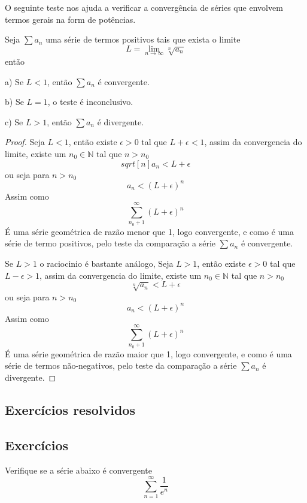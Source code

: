 O seguinte teste nos ajuda a verificar a convergência de séries que envolvem
termos gerais na form de potências.

\begin{teo}
    Seja $\sum a_n$ uma série de termos positivos tais que exista o limite
    $$L = \lim_{n \to \infty} \sqrt[n]{a_n} $$
    então
    \item [a)] Se $L < 1$, então $\sum a_n$ é convergente.
    \item [b)] Se $L = 1$, o teste é inconclusivo.
    \item [c)] Se $L > 1$, então $\sum a_n$ é divergente.
\end{teo}

\begin{proof}
    Seja $L<1$, então existe $\epsilon > 0$ tal que $L + \epsilon < 1$, assim
    da convergencia do limite, existe um $n_0 \in \mathbb{N}$ tal que $n>n_0$
    $$ sqrt[n]{a_n} < L + \epsilon$$
    ou seja para $n>n_0$
    $$ a_n < (L + \epsilon)^{n}$$    
    Assim como 
    $$\sum_{n_0+1}^{\infty} (L + \epsilon)^{n} $$
    É uma série geométrica de razão menor que 1, logo convergente, e como
    é uma série de termo positivos, pelo teste da comparação a série $\sum a_n$
    é convergente.

    Se $L>1$ o raciocinio é bastante análogo, Seja $L>1$, então existe $\epsilon > 0$
    tal que $L - \epsilon > 1$, assim da convergencia do limite, existe um 
    $n_0 \in \mathbb{N}$ tal que $n>n_0$
    $$ \sqrt[n]{a_n} < L + \epsilon$$
    ou seja para $n>n_0$
    $$ a_n < (L + \epsilon)^{n}$$    
    Assim como 
    $$\sum_{n_0+1}^{\infty} (L + \epsilon)^{n} $$   
    É uma série geométrica de razão maior que 1, logo convergente, e como
    é uma série de termos não-negativos, pelo teste da comparação a série $\sum a_n$
    é divergente.

\end{proof}

\subsection*{Exercícios resolvidos}

\construirExeresol


\subsection*{Exercícios}

\construirExer

\begin{exer}
    Verifique se a série abaixo é convergente 
    $$\sum_{n =1}^{\infty} \frac{1}{e^n}$$
\end{exer}

